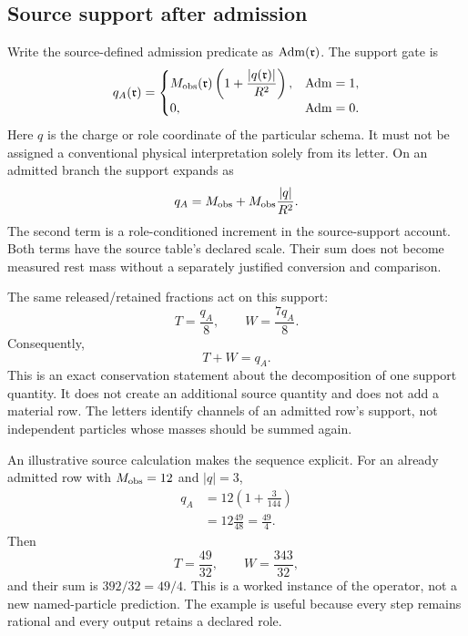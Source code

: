 \subsection{Source support after admission}

Write the source-defined admission predicate as ${\rm Adm}(\mathfrak r)$. The support gate is
\begin{equation}
q_A(\mathfrak r)=
\begin{cases}
M_{\rm obs}(\mathfrak r)
\left(1+\dfrac{|q(\mathfrak r)|}{R^2}\right),
&{\rm Adm}=1,\\[3pt]
0,&{\rm Adm}=0.
\end{cases}
\end{equation}
Here $q$ is the charge or role coordinate of the particular schema. It must not be assigned a conventional physical interpretation solely from its letter. On an admitted branch the support expands as
\begin{equation}
q_A=M_{\rm obs}+M_{\rm obs}\frac{|q|}{R^2}.
\end{equation}
The second term is a role-conditioned increment in the source-support account. Both terms have the source table's declared scale. Their sum does not become measured rest mass without a separately justified conversion and comparison.

The same released/retained fractions act on this support:
\begin{equation}
T=\frac{q_A}{8},\qquad
W=\frac{7q_A}{8}.
\end{equation}
Consequently,
\begin{equation}
T+W=q_A.
\end{equation}
This is an exact conservation statement about the decomposition of one support quantity. It does not create an additional source quantity and does not add a material row. The letters identify channels of an admitted row's support, not independent particles whose masses should be summed again.

An illustrative source calculation makes the sequence explicit. For an already admitted row with $M_{\rm obs}=12$ and $|q|=3$,
\begin{align}
q_A&=12\left(1+\frac3{144}\right)\\
&=12\frac{49}{48}=\frac{49}{4}.
\end{align}
Then
\begin{equation}
T=\frac{49}{32},\qquad W=\frac{343}{32},
\end{equation}
and their sum is $392/32=49/4$. This is a worked instance of the operator, not a new named-particle prediction. The example is useful because every step remains rational and every output retains a declared role.

